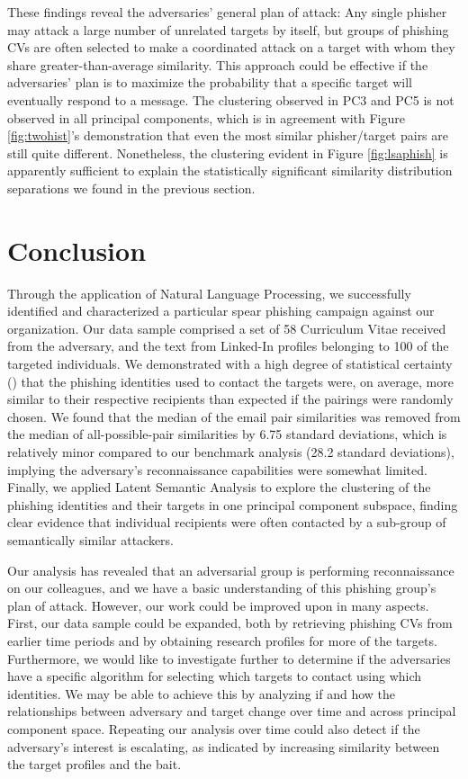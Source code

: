 \documentclass[conference]{IEEEtran}
\begin{document}
These findings reveal the adversaries' general plan of attack: Any single phisher may attack a large number of unrelated targets by itself, but groups of phishing CVs are often selected to make a coordinated 
attack on a target with whom they share greater-than-average similarity.  This approach could be effective if the adversaries' plan is to maximize the probability that a specific target will eventually respond to a 
message.  The clustering observed in PC3 and PC5 is not observed in all principal components, which is in agreement with Figure \ref{fig:twohist}'s demonstration that even the most similar phisher/target pairs 
are still quite different.  Nonetheless, the clustering evident in Figure \ref{fig:lsaphish} is apparently sufficient to explain the statistically significant similarity distribution separations we found in the previous section.

\section{Conclusion}
Through the application of Natural Language Processing, we successfully identified and characterized a particular spear phishing campaign against our organization.  Our data sample comprised a set of 58 Curriculum Vitae received from the adversary, and the text from Linked-In profiles belonging to 100 of the targeted individuals.  We demonstrated with a high degree of statistical certainty () that the phishing identities used to contact the targets were, on average, more similar to their respective recipients than expected if the pairings were randomly chosen.  We found that the median of the 
email pair similarities was removed from the median of all-possible-pair similarities by 6.75 standard deviations, which is relatively minor compared to 
our benchmark analysis (28.2 standard deviations), implying the adversary's reconnaissance capabilities were somewhat limited.  Finally, we applied Latent Semantic Analysis to explore the clustering of the phishing identities and their targets in one principal component subspace, finding clear evidence that individual recipients were often contacted by a sub-group of semantically similar attackers.

Our analysis has revealed that an adversarial group is performing reconnaissance on our colleagues, and we have a basic understanding of this phishing group's plan of attack.  However, our work could be improved upon in many aspects.  First, our data sample could be expanded, both by retrieving phishing CVs from earlier time periods and by obtaining research profiles for more of the targets.  Furthermore, we would like to investigate further to determine if the adversaries have a specific algorithm for selecting which targets to contact using which identities.  We may be able to achieve this by analyzing if and how the relationships between adversary and target change over time and across principal component space.  Repeating our analysis over time could also detect 
if the adversary's interest is escalating, as indicated by increasing similarity between the target profiles and the bait.
\end{document}
